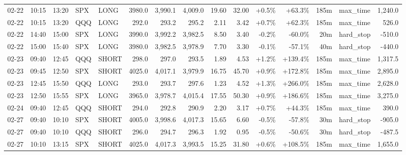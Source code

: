 \documentclass[11pt,a4paper,twoside]{article}
\begin{document}
\begin{landscape}
\begin{center}
\begin{longtable}{>{\color{txtmain}}l l l l l r r r r r r r r >{\color{txtmain}}l r}
02-22 & 10:15 & 13:20 & SPX & LONG & 3980.0 & 3,990.1 & 4,009.0 & 19.60 & 32.00 & \textcolor{wingreen}{+0.5\%} & \textcolor{wingreen}{+63.3\%} & 185m & max\_time & \textcolor{wingreen}{1,240.0} \\
02-22 & 10:15 & 13:20 & QQQ & LONG & 292.0 & 293.2 & 295.2 & 2.11 & 3.42 & \textcolor{wingreen}{+0.7\%} & \textcolor{wingreen}{+62.3\%} & 185m & max\_time & \textcolor{wingreen}{526.0} \\
02-22 & 14:40 & 15:00 & SPX & LONG & 3990.0 & 3,992.2 & 3,982.5 & 8.50 & 3.40 & \textcolor{lossred}{-0.2\%} & \textcolor{lossred}{-60.0\%} & 20m & hard\_stop & \textcolor{lossred}{-510.0} \\
02-22 & 15:00 & 15:40 & SPX & LONG & 3980.0 & 3,982.5 & 3,978.9 & 7.70 & 3.30 & \textcolor{lossred}{-0.1\%} & \textcolor{lossred}{-57.1\%} & 40m & hard\_stop & \textcolor{lossred}{-440.0} \\
02-23 & 09:40 & 12:45 & QQQ & SHORT & 298.0 & 297.0 & 293.5 & 1.89 & 4.53 & \textcolor{wingreen}{+1.2\%} & \textcolor{wingreen}{+139.4\%} & 185m & max\_time & \textcolor{wingreen}{1,317.5} \\
02-23 & 09:45 & 12:50 & SPX & SHORT & 4025.0 & 4,017.1 & 3,979.9 & 16.75 & 45.70 & \textcolor{wingreen}{+0.9\%} & \textcolor{wingreen}{+172.8\%} & 185m & max\_time & \textcolor{wingreen}{2,895.0} \\
02-23 & 12:45 & 15:50 & QQQ & LONG & 293.0 & 293.7 & 297.6 & 1.23 & 4.52 & \textcolor{wingreen}{+1.3\%} & \textcolor{wingreen}{+266.0\%} & 185m & max\_time & \textcolor{wingreen}{2,628.0} \\
02-23 & 12:50 & 15:55 & SPX & LONG & 3965.0 & 3,978.7 & 4,015.4 & 17.55 & 50.30 & \textcolor{wingreen}{+0.9\%} & \textcolor{wingreen}{+186.6\%} & 185m & max\_time & \textcolor{wingreen}{3,275.0} \\
02-24 & 09:40 & 12:45 & QQQ & SHORT & 294.0 & 292.8 & 290.9 & 2.20 & 3.17 & \textcolor{wingreen}{+0.7\%} & \textcolor{wingreen}{+44.3\%} & 185m & max\_time & \textcolor{wingreen}{390.0} \\
02-27 & 09:40 & 10:10 & SPX & SHORT & 4005.0 & 3,998.6 & 4,017.3 & 15.65 & 6.60 & \textcolor{lossred}{-0.5\%} & \textcolor{lossred}{-57.8\%} & 30m & hard\_stop & \textcolor{lossred}{-905.0} \\
02-27 & 09:40 & 10:10 & QQQ & SHORT & 296.0 & 294.7 & 296.3 & 1.92 & 0.95 & \textcolor{lossred}{-0.5\%} & \textcolor{lossred}{-50.6\%} & 30m & hard\_stop & \textcolor{lossred}{-487.5} \\
02-27 & 10:10 & 13:15 & SPX & SHORT & 4025.0 & 4,017.3 & 3,993.5 & 15.25 & 31.80 & \textcolor{wingreen}{+0.6\%} & \textcolor{wingreen}{+108.5\%} & 185m & max\_time & \textcolor{wingreen}{1,655.0} \\

\end{longtable}
\end{center}
\end{landscape}
\end{document}

